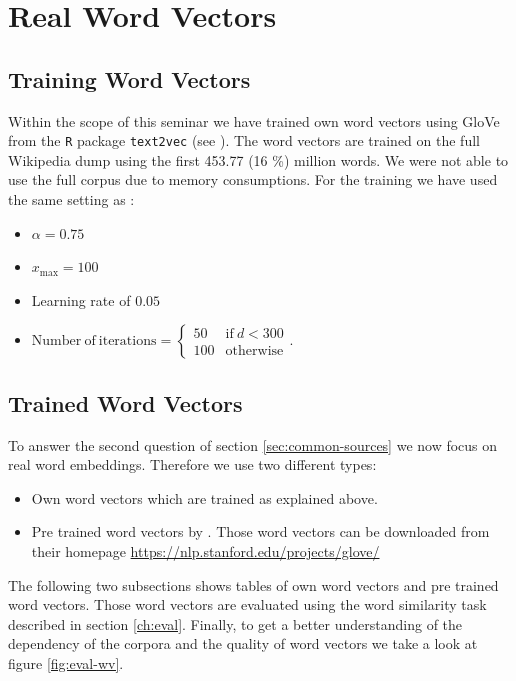 \chapter{Real Word Vectors}\label{ch:real_wv}

\section{Training Word Vectors}

Within the scope of this seminar we have trained own word vectors using GloVe from  
the \texttt{R} package \texttt{text2vec} (see \cite{text2vec}). The word vectors 
are trained on the full Wikipedia dump using the first 453.77 (16 \%) million words. 
We were not able to use the full corpus due to memory consumptions. For the training
we have used the same setting as \cite{pennington2014glove}:
\begin{itemize}
  \item $\alpha = 0.75$
  \item $x_\mathrm{max} = 100$
  \item Learning rate of $0.05$
  \item $\mathrm{Number\ of\ iterations} = \left\{\begin{array}{cc}
         50 & \text{if} \ d < 300 \\
         100 & \text{otherwise}
         \end{array}\right.$.
\end{itemize}

\section{Trained Word Vectors}

To answer the second question of section \ref{sec:common-sources} we now focus on
real word embeddings. Therefore we use two different types:
\begin{itemize}
  \item
    Own word vectors which are trained as explained above.
    
  \item
    Pre trained word vectors by \cite{pennington2014glove}. Those word vectors
    can be downloaded from their homepage \url{https://nlp.stanford.edu/projects/glove/}
\end{itemize}

The following two subsections shows tables of own word vectors and pre trained 
word vectors. Those word vectors are evaluated using the word similarity task
described in section \ref{ch:eval}. Finally, to get a better understanding of 
the dependency of the corpora and the quality of word vectors we take a look 
at figure \ref{fig:eval-wv}.

